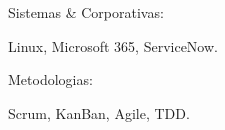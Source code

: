 \begin{cventries}
  \cventry
    {} %
    {Sistemas \& Corporativas:} %
    {} %
    {} %
    {
      \begin{cvitems} %
        \item {Linux, Microsoft 365, ServiceNow.}
      \end{cvitems}
    }

  \cventry
    {} %
    {Metodologias:} %
    {} %
    {} %
    {
      \begin{cvitems} %
        \item {Scrum, KanBan, Agile, TDD.}
      \end{cvitems}
    }

\end{cventries}
